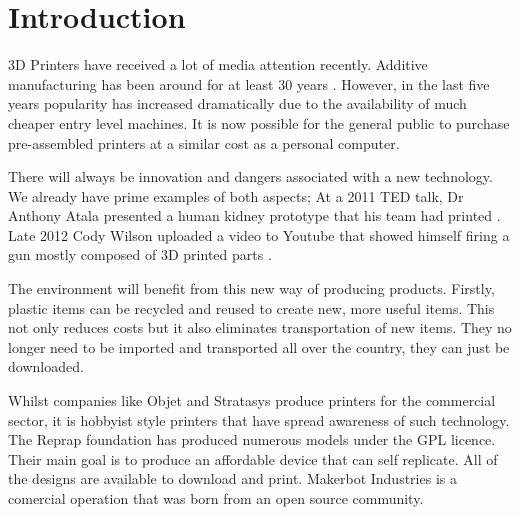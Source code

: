 \documentclass[a4paper, 11pt, twoside]{Thesis}  %
\begin{document}
\pagestyle{fancy}  %


\tableofcontents  %

\listoffigures  %

\listoftables  %

\mainmatter
\pagestyle{fancy}

\chapter{Introduction}
\label{Introduction}

3D Printers have received a lot of media attention recently. Additive manufacturing has been around for at least 30 years \cite{1, 2}. However, in the last five years popularity has increased dramatically due to the availability of much cheaper entry level machines. It is now possible for the general public to purchase pre-assembled printers at a similar cost as a personal computer.

There will always be innovation and dangers associated with a new technology. We already have prime examples of both aspects; At a 2011 TED talk, Dr Anthony Atala presented a human kidney prototype that his team had printed \cite{3}. Late 2012 Cody Wilson uploaded a video to Youtube that showed himself firing a gun mostly composed of 3D printed parts \cite{4}.

The environment will benefit from this new way of producing products. Firstly, plastic items can be recycled and reused to create new, more useful items. This not only reduces costs but it also eliminates transportation of new items. They no longer need to be imported and transported all over the country, they can just be downloaded.

Whilst companies like Objet and Stratasys produce printers for the commercial sector, it is hobbyist style printers that have spread awareness of such technology. The Reprap foundation has produced numerous models under the GPL licence. Their main goal is to produce an affordable device that can self replicate. All of the designs are available to download and print. Makerbot Industries is a comercial operation that was born from an open source community.
\end{document}
